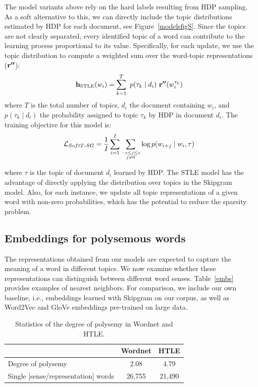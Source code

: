 The model variants above rely on the hard labels resulting from HDP sampling.
As a soft alternative to this, we can directly %
include the topic distributions estimated by HDP for each document, see Figure~\ref{modelsfigS}. 
Since the topics are not clearly separated, every identified topic of a word can contribute to the learning process proportional to its value.
%
%
Specifically, for each update, we use the topic distribution to compute a weighted sum over the word-topic representations ($\bm{\mathbf{r''}}$):
\begin{equation}\label{eq:STLE}
\vt{h}_\textrm{STLE}(w_i) = \sum_{k=1}^{T}  \ p(\tau_k \mid d_i) \ \vt{r''}(w_i^{\tau_k})
\end{equation}
where $T$ is the total number of topics, $d_i$ the document containing $w_i$, and $p(\tau_k \mid d_i)$ the probability assigned to topic $\tau_k$ by HDP in document $d_i$.
%
The training objective for this model is:
%
\begin{align}\small
\mathcal{L}_{SoftT\textrm{-}SG} = \frac{1}{I} \sum_{i=1}^I \sum_{\substack{-c \le j \le c \\ j \ne 0}}{\log p(w_{i+j} \mid w_i, \tau)}
\end{align}


\noindent%
where $\tau$ is the topic of document $d_i$ learned by HDP. 
The STLE model has the advantage of directly applying the distribution over topics in the Skipgram model. 
Also, for each instance, we update all topic representations of a given word with non-zero probabilities, which has the potential to reduce the sparsity problem.

\subsection{Embeddings for polysemous words}

The representations obtained from our models are expected to capture the meaning of a word in different topics.
We now examine whether these representations can distinguish between different word senses.
Table~\ref{embs} provides examples of nearest neighbors. 
For comparison, we include our own baseline, i.e., embeddings learned with Skipgram on our corpus, as well as Word2Vec \citep{mikolov2013distributed} 
and GloVe embeddings \citep{pennington2014glove} 
pre-trained on large data.

\begin{table}
\centering
\small
\caption{Statistics of the degree of polysemy in Wordnet and HTLE. \label{wordnetinfo}} %
\begin{tabularx}{0.65\textwidth}{lcc}
\toprule
& \textbf{Wordnet} & \textbf{HTLE} \\
\midrule
 Degree of polysemy & 2.08 & 4.79 \\
  Single [sense/representation] words &  26,755 & 21,490 \\
\bottomrule
\end{tabularx}
\end{table}


